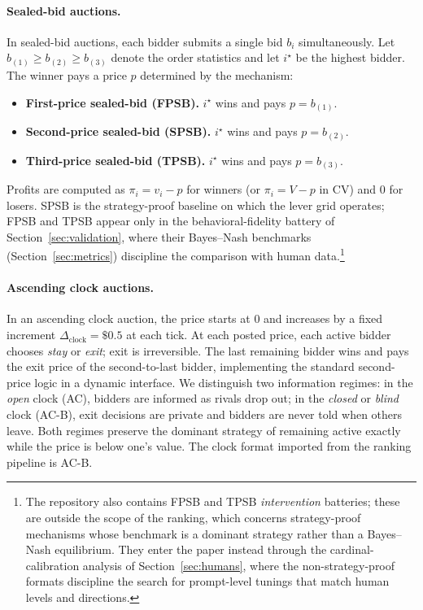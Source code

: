 \paragraph{Sealed-bid auctions.}
In sealed-bid auctions, each bidder submits a single bid $b_{i}$
simultaneously. Let $b_{(1)}\ge b_{(2)}\ge b_{(3)}$ denote the order statistics
and let $i^\star$ be the highest bidder. The winner pays a price $p$ determined
by the mechanism:
\begin{itemize}
    \item \textbf{First-price sealed-bid (FPSB).} $i^\star$ wins and pays
    $p=b_{(1)}$.
    \item \textbf{Second-price sealed-bid (SPSB).} $i^\star$ wins and pays
    $p=b_{(2)}$.
    \item \textbf{Third-price sealed-bid (TPSB).} $i^\star$ wins and pays
    $p=b_{(3)}$.
\end{itemize}
Profits are computed as $\pi_{i}=v_{i}-p$ for winners (or $\pi_{i}=V-p$ in CV)
and $0$ for losers. SPSB is the strategy-proof baseline on which the lever grid
operates; FPSB and TPSB appear only in the behavioral-fidelity battery of
Section~\ref{sec:validation}, where their Bayes--Nash benchmarks
(Section~\ref{sec:metrics}) discipline the comparison with human
data.\footnote{The repository also contains FPSB and TPSB \emph{intervention}
batteries; these are outside the scope of the ranking, which concerns
strategy-proof mechanisms whose benchmark is a dominant strategy rather than a
Bayes--Nash equilibrium. They enter the paper instead through the
cardinal-calibration analysis of Section~\ref{sec:humans}, where the
non-strategy-proof formats discipline the search for prompt-level tunings that
match human levels and directions.}

\paragraph{Ascending clock auctions.}
In an ascending clock auction, the price starts at $0$ and increases by a fixed
increment $\Delta_{\text{clock}}=\$0.5$ at each tick. At each posted price,
each active bidder chooses \emph{stay} or \emph{exit}; exit is irreversible.
The last remaining bidder wins and pays the exit price of the second-to-last
bidder, implementing the standard second-price logic in a dynamic interface. We
distinguish two information regimes: in the \emph{open} clock (AC), bidders are
informed as rivals drop out; in the \emph{closed} or \emph{blind} clock (AC-B),
exit decisions are private and bidders are never told when others leave. Both
regimes preserve the dominant strategy of remaining active exactly while the
price is below one's value. The clock format imported from the ranking
pipeline is AC-B.

